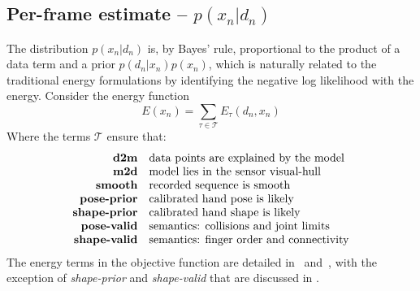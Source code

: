 \subsection{Per-frame estimate -- $p(x_n|d_n)$}
\label{sec:independent}
\label{sec:intra}
The distribution $p(x_n|d_n)$ is, by Bayes' rule, proportional to the product of a data term and a prior $p(d_n|x_n)p(x_n)$, which is naturally related to the traditional energy formulations by identifying the negative log likelihood with the energy.  Consider the energy function
% 
\begin{equation}
E(x_n) = \sum_{\tau \in \mathcal{T}} E_{\tau}(d_n, x_n) 
\label{eq:energies}
\end{equation}
% 
Where the terms $\mathcal{T}$ ensure that:
%
\begin{equation*}
\setlength{\jot}{0pt}
\begin{aligned}
\text{\textbf{d2m}} & \quad \text{data points are explained by the model} \\ 
\text{\textbf{m2d}} & \quad \text{model lies in the sensor visual-hull} \\
\text{\textbf{smooth}} & \quad \text{recorded sequence is smooth} \\
\text{\textbf{pose-prior}} & \quad \text{calibrated hand pose is likely} \\
\text{\textbf{shape-prior}} & \quad \text{calibrated hand shape is likely} \\
\text{\textbf{pose-valid}} & \quad \text{semantics: collisions and joint limits} \\
\text{\textbf{shape-valid}} & \quad \text{semantics: finger order and connectivity}
\end{aligned}
\end{equation*}
The energy terms in the objective function are detailed in~\cite{tkach2016sphere} and~\cite{htrack}, with the exception of \emph{shape-prior} and \emph{shape-valid} that are discussed in .


